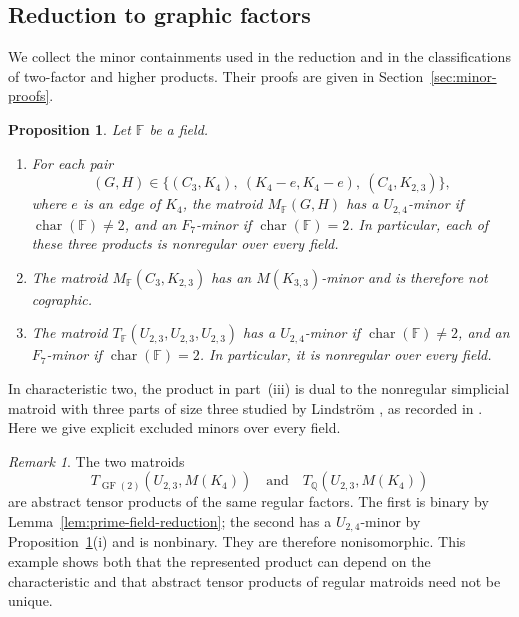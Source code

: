 \documentclass[12pt,a4paper]{article}
\numberwithin{equation}{section}
\newcommand{\F}{\mathbb F}
\newcommand{\QQ}{\mathbb Q}
\newtheorem{proposition}[proposition]{Proposition}
\theoremstyle{definition}
\theoremstyle{remark}
\newtheorem{remark}[remark]{Remark}
\begin{document}
\subsection{Reduction to graphic factors}\label{subsec:graphic-reduction}
We collect the minor containments used in the reduction and in the
classifications of two-factor and higher products.  Their proofs are
given in Section~\ref{sec:minor-proofs}.
\begin{proposition}\label{prop:specified-minors}
Let \(\F\) be a field.
\begin{enumerate}[label=\textup{(\roman*)},leftmargin=2.5em]
\item For each pair
\[
 (G,H)\in\{(C_3,K_4),\ (K_4-e,K_4-e),\ (C_4,K_{2,3})\},
\]
where \(e\) is an edge of \(K_4\), the matroid \(M_{\F}(G,H)\)
has a \(U_{2,4}\)-minor if \(\operatorname{char}(\F)\ne2\), and an
\(F_7\)-minor if \(\operatorname{char}(\F)=2\).  In particular, each
of these three products is nonregular over every field.
\item The matroid \(M_{\F}(C_3,K_{2,3})\) has an
\(M(K_{3,3})\)-minor and is therefore not cographic.
\item The matroid \(T_{\F}(U_{2,3},U_{2,3},U_{2,3})\) has a
\(U_{2,4}\)-minor if \(\operatorname{char}(\F)\ne2\), and an
\(F_7\)-minor if \(\operatorname{char}(\F)=2\).  In particular,
it is nonregular over every field.
\end{enumerate}
\end{proposition}

In characteristic two, the product in part~\textup{(iii)} is dual
to the nonregular simplicial matroid with three parts of size three
studied by Lindstr\"om \cite{lindstrom-nonregular}, as recorded in
\cite[Exercise~6.6, p.~112]{cordovil-lindstrom}.
Here we give explicit excluded minors over every field.

\begin{remark}\label{ex:regular-characteristic}
The two matroids
\[
 T_{\operatorname{GF}(2)}(U_{2,3},M(K_4))
 \quad\text{and}\quad
 T_{\QQ}(U_{2,3},M(K_4))
\]
are abstract tensor products of the same regular factors.
The first is binary by Lemma~\ref{lem:prime-field-reduction}; the
second has a \(U_{2,4}\)-minor by
Proposition~\ref{prop:specified-minors}\textup{(i)} and is nonbinary.
They are therefore nonisomorphic.  This example shows both that the
represented product can depend on the characteristic and that
abstract tensor products of regular matroids need not be unique.
\end{remark}
\end{document}
